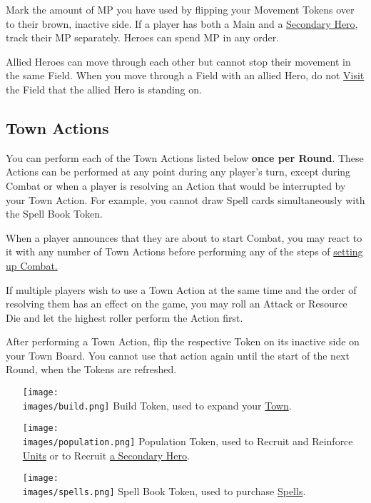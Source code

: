 \begin{multicols}{2}
\bigskip

Mark the amount of MP you have used by flipping your Movement Tokens over to their brown, inactive side.
If a player has both a Main and a \hyperlink{Secondary}{Secondary Hero}, track their MP separately.
Heroes can spend MP in any order.\par
Allied Heroes can move through each other but cannot stop their movement in the same Field.
When you move through a Field with an allied Hero, do not \hyperlink{Categories}{Visit} the Field that the allied Hero is standing on.\par
{}

\subsection*{Town Actions}
You can perform each of the Town Actions listed below \textbf{once per Round}.
These Actions can be performed at any point during any player's turn, except during Combat or when a player is resolving an Action that would be interrupted by your Town Action.
For example, you cannot draw Spell cards simultaneously with the Spell Book Token.\par
When a player announces that they are about to start Combat, you may react to it with any number of Town Actions before performing any of the steps of \hyperlink{Combatsetup}{setting up Combat.}\par
If multiple players wish to use a Town Action at the same time and the order of resolving them has an effect on the game, you may roll an Attack or Resource Die and let the highest roller perform the Action first.\par
After performing a Town Action, flip the respective Token on its inactive side on your Town Board.
You cannot use that action again until the start of the next Round, when the Tokens are refreshed.
\begin{itemize}
  \item [{\texttt{[image: \\images/build.png]}}] Build Token, used to expand your \hyperlink{Town}{Town}.
  \item [{\texttt{[image: \\images/population.png]}}] Population Token, used to Recruit and Reinforce \hyperlink{Units}{Units} or to Recruit \hyperlink{Secondary}{a Secondary Hero}.
  \item [{\texttt{[image: \\images/spells.png]}}]Spell Book Token, used to purchase \hyperlink{spells}{Spells}.
\end{itemize}


\end{multicols}
